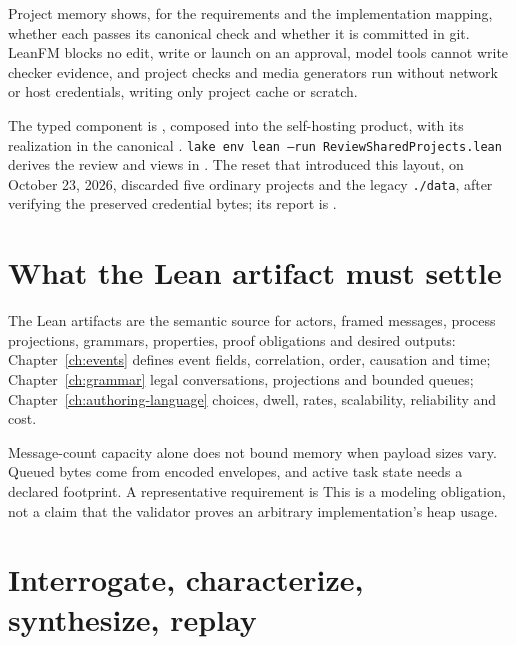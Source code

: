 Project memory shows, for the requirements and the implementation mapping,
whether each passes its canonical check and whether it is committed in git. LeanFM
blocks no edit, write or launch on an approval, model tools cannot write checker
evidence, and project checks and media generators run without network or host
credentials, writing only project cache or scratch.

The typed component is , composed
into the self-hosting product, with its realization in the canonical
. \texttt{lake env lean --run
ReviewSharedProjects.lean} derives the review and views in
. The reset that introduced this layout, on
October 23, 2026, discarded five ordinary projects and the legacy
\texttt{./data}, after verifying the preserved credential bytes; its report is
.

\section{What the Lean artifact must settle}

The Lean artifacts are the semantic source for actors, framed messages, process
projections, grammars, properties, proof obligations and desired outputs:
Chapter~\ref{ch:events} defines event fields, correlation, order, causation and
time; Chapter~\ref{ch:grammar} legal conversations, projections and bounded
queues; Chapter~\ref{ch:authoring-language} choices, dwell, rates, scalability,
reliability and cost.

Message-count capacity alone does not bound memory when payload sizes vary.
Queued bytes come from encoded envelopes, and active task state needs a declared
footprint. A representative requirement is
This is a modeling obligation, not a claim that the validator proves an arbitrary
implementation's heap usage.

\section{Interrogate, characterize, synthesize, replay}

